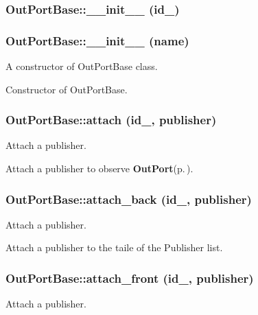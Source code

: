 \subsubsection{\setlength{\rightskip}{0pt plus 5cm}Out\-Port\-Base::\_\-\_\-init\_\-\_\- (id\_\-)}\label{classOutPortBase_OutPortBasea2}


\subsubsection{\setlength{\rightskip}{0pt plus 5cm}Out\-Port\-Base::\_\-\_\-init\_\-\_\- (name)}\label{classOutPortBase_OutPortBasea0}


A constructor of Out\-Port\-Base class. 

Constructor of Out\-Port\-Base.
\subsubsection{\setlength{\rightskip}{0pt plus 5cm}Out\-Port\-Base::attach (id\_\-, publisher)}\label{classOutPortBase_OutPortBasea9}


Attach a publisher. 

Attach a publisher to observe {\bf Out\-Port}{\rm (p.\,\pageref{classOutPort})}.
\subsubsection{\setlength{\rightskip}{0pt plus 5cm}Out\-Port\-Base::attach\_\-back (id\_\-, publisher)}\label{classOutPortBase_OutPortBasea11}


Attach a publisher. 

Attach a publisher to the taile of the Publisher list.
\subsubsection{\setlength{\rightskip}{0pt plus 5cm}Out\-Port\-Base::attach\_\-front (id\_\-, publisher)}\label{classOutPortBase_OutPortBasea10}


Attach a publisher. 

